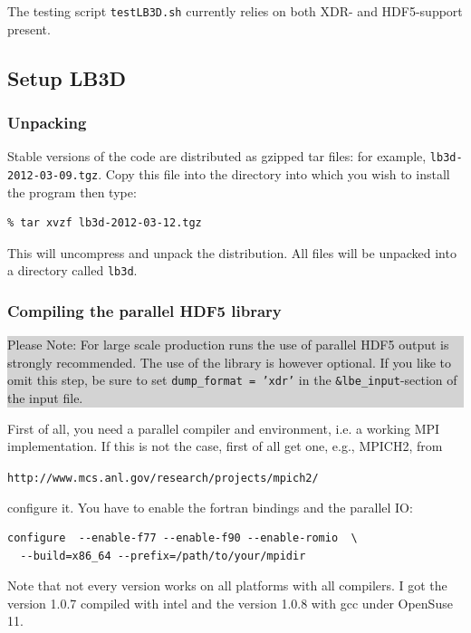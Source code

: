 \documentclass[a4paper]{article}
\begin{document}
The testing script {\tt testLB3D.sh} currently relies on both XDR- and HDF5-support present.

\subsection{Setup LB3D}

\subsubsection{Unpacking}

Stable versions of the code are distributed as gzipped tar files: for
example, {\tt lb3d-2012-03-09.tgz}. Copy this file into the
directory into which you wish to install the program then type:
\begin{verbatim}
% tar xvzf lb3d-2012-03-12.tgz
\end{verbatim}
This will uncompress and unpack the distribution. All files will be
unpacked into a directory called {\tt lb3d}.\\

\subsubsection{Compiling the parallel HDF5 library}

\vspace{2em}
\colorbox{lightgray}{\parbox{\textwidth}
{
  \vskip10pt


{Please Note: For large scale production runs the use of parallel HDF5 output is strongly recommended. The use of the library is however optional. If you like to omit this step, be sure to set {\tt dump\_format = 'xdr'} in the {\tt \&lbe\_input}-section of the input file.
}
}}
\vspace{2em}

First of all, you need a parallel compiler and environment, i.e. a working
MPI implementation. If this is not the case, first of all get one, e.g.,
MPICH2, from

\verb|http://www.mcs.anl.gov/research/projects/mpich2/|

configure it. You have to enable the fortran bindings and the parallel IO:

\begin{verbatim}
configure  --enable-f77 --enable-f90 --enable-romio  \
  --build=x86_64 --prefix=/path/to/your/mpidir
\end{verbatim}

Note that not every version works on all platforms with all compilers. I got
the version 1.0.7 compiled with intel and the version 1.0.8 with gcc under 
OpenSuse 11.
\end{document}
